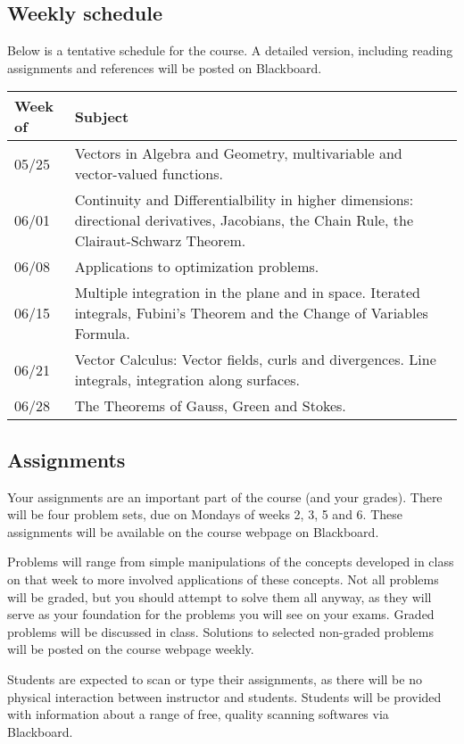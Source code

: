 \documentclass[11pt]{amsart}
\numberwithin{equation}{section}
\begin{document}
\subsection{Weekly schedule}
Below is a tentative schedule for the course. A detailed version, including reading assignments and references will be posted on Blackboard. 

\begin{center}
\begin{tabular}{p{}|p{}}
\hline 
Week of & Subject \\ 
\hline 
05/25 & Vectors in Algebra and Geometry, multivariable and vector-valued functions.  \\ 
\hline 
06/01 & Continuity and Differentialbility in higher dimensions: directional derivatives, Jacobians, the Chain Rule, the Clairaut-Schwarz Theorem.  \\ 
\hline 
06/08 & Applications to optimization problems. \\ 
\hline 
06/15 & Multiple integration in the plane and in space. Iterated integrals, Fubini's Theorem and the Change of Variables Formula. \\ 
\hline 
06/21 & Vector Calculus: Vector fields, curls and divergences. Line integrals, integration along surfaces.  \\ 
\hline 
06/28 & The Theorems of Gauss, Green and Stokes. \\ 
\hline 
\end{tabular} 
\end{center}

\subsection{Assignments}
Your assignments are an important part of the course (and your grades). There will be four problem sets, due on Mondays of weeks 2, 3, 5 and 6. These assignments will be available on the course webpage on Blackboard.

 Problems will range from simple manipulations of the concepts developed in class on that week to more involved applications of these concepts. Not all problems will be graded, but you should attempt to solve them all anyway, as they will serve as your foundation for the problems you will see on your exams. Graded problems will be discussed in class. Solutions to selected non-graded problems will be posted on the course webpage weekly.  
 
 Students are expected to scan or type their assignments, as there will be no physical interaction between instructor and students. Students will be provided with information about a range of free, quality scanning softwares via Blackboard. 
\end{document}
